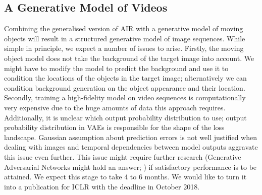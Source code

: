     
    \subsection{A Generative Model of Videos}
        Combining the generalised version of AIR with a generative model of moving objects will result in a structured generative model of image sequences. While simple in principle, we expect a number of issues to arise. Firstly, the moving object model does not take the background of the target image into account. We might have to modify the model to predict the background and use it to condition the locations of the objects in the target image; alternatively we can condition background generation on the object appearance and their location. 
        Secondly, training a high-fidelity model on video sequences is computationally very expensive due to the huge amounts of data this approach requires.
        Additionally, it is unclear which output probability distribution to use; output probability distribution in VAEs is responsible for the shape of the loss landscape. Gaussian assumption about prediction errors is not well justified when dealing with images and temporal dependencies between model outputs aggravate this issue even further. This issue might require further research (Generative Adversarial Networks might hold an answer; \cite{Wenzhe2016}) if satisfactory performance is to be attained. We expect this stage to take 4 to 6 months.
        We would like to turn it into a publication for ICLR with the deadline in October 2018.
    
